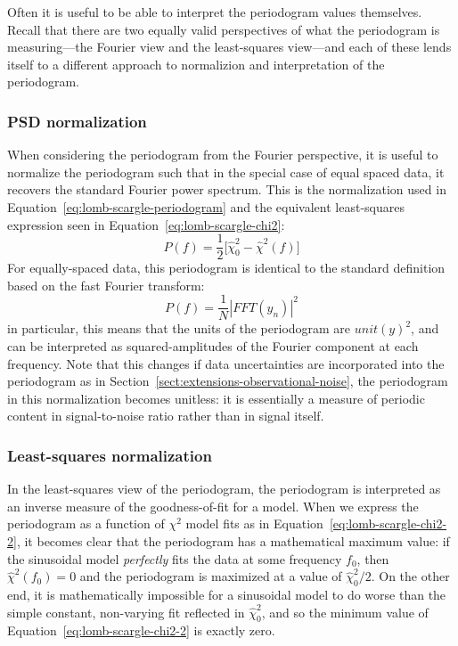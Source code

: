 \documentclass[preprint]{aastex}
\newcommand{\Eq}[1]{Equation~\ref{eq:#1}}
\newcommand{\eq}[1]{\Eq{#1}}
\newcommand{\eqlabel}[1]{\label{eq:#1}}
\newcommand{\Sect}[1]{Section~\ref{sect:#1}}
\newcommand{\sect}[1]{\Sect{#1}}
\begin{document}
Often it is useful to be able to interpret the periodogram values themselves.
Recall that there are two equally valid perspectives of what the periodogram
is measuring---the Fourier view and the least-squares view---and each of these
lends itself to a different approach to normalizion and interpretation of the
periodogram.

\subsubsection{PSD normalization}
When considering the periodogram from the Fourier perspective,
it is useful to normalize the periodogram such that in the special case
of equal spaced data, it recovers the standard Fourier power spectrum.
This is the normalization used in \eq{lomb-scargle-periodogram} and the
equivalent least-squares expression seen in \eq{lomb-scargle-chi2}:
\begin{equation}
  P(f) = \frac{1}{2}\big[\hat{\chi}^2_0 - \hat{\chi}^2(f)\big]
  \eqlabel{lomb-scargle-chi2-2}
\end{equation}
For equally-spaced data, this periodogram is identical to the standard
definition based on the fast Fourier transform:
\begin{equation}
  P(f) = \frac{1}{N} \left| FFT(y_n) \right|^2
\end{equation}
in particular, this means that the units of the periodogram are $unit(y)^2$,
and can be interpreted as squared-amplitudes of the Fourier component at
each frequency.
Note that this changes if data uncertainties are incorporated into
the periodogram as in \sect{extensions-observational-noise},
the periodogram in this normalization becomes unitless: it is essentially
a measure of periodic content in signal-to-noise ratio
rather than in signal itself.

\subsubsection{Least-squares normalization}
In the least-squares view of the periodogram, the periodogram is interpreted
as an inverse measure of the goodness-of-fit for a model.
When we express the periodogram as a function of $\chi^2$ model fits as in
\eq{lomb-scargle-chi2-2}, it becomes clear that the periodogram has a
mathematical maximum value: if the sinusoidal model {\it perfectly} fits
the data at some frequency $f_0$, then $\hat{\chi}^2(f_0) = 0$ and the
periodogram is maximized at a value of $\hat{\chi}^2_0 / 2$.
On the other end, it is mathematically impossible for a sinusoidal model to
do worse than the simple constant, non-varying fit reflected in
$\hat{\chi}^2_0$, and so the minimum value of \eq{lomb-scargle-chi2-2} is
exactly zero.
\end{document}
